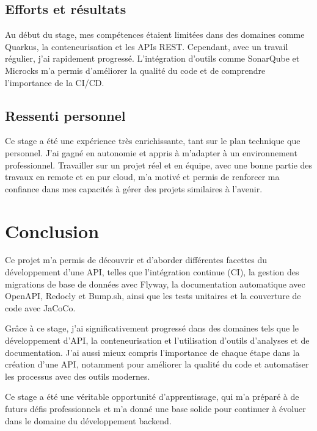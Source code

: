 \documentclass[11pt]{article}
\begin{document}
		\subsection*{Efforts et résultats}
		
		Au début du stage, mes compétences étaient limitées dans des domaines comme Quarkus, la conteneurisation et les APIs REST. Cependant, avec un travail régulier, j'ai rapidement progressé. L'intégration d'outils comme SonarQube et Microcks m'a permis d'améliorer la qualité du code et de comprendre l'importance de la CI/CD.
		
		\subsection*{Ressenti personnel}
		
			Ce stage a été une expérience très enrichissante, tant sur le plan technique que personnel. J'ai gagné en autonomie et appris à m'adapter à un environnement professionnel. Travailler sur un projet réel et en équipe, avec une bonne partie des travaux en remote et en pur cloud, m'a motivé et permis de renforcer ma confiance dans mes capacités à gérer des projets similaires à l'avenir.
		
	\section{Conclusion}
	
		Ce projet m'a permis de découvrir et d’aborder différentes facettes du développement d'une API, telles que l'intégration continue (CI), la gestion des migrations de base de données avec Flyway, la documentation automatique avec OpenAPI, Redocly et Bump.sh, ainsi que les tests unitaires et la couverture de code avec JaCoCo.
		
		\vspace{0.2cm}
		
		Grâce à ce stage, j’ai significativement progressé dans des domaines tels que le développement d'API, la conteneurisation et l’utilisation d’outils d'analyses et de documentation. J’ai aussi mieux compris l’importance de chaque étape dans la création d’une API, notamment pour améliorer la qualité du code et automatiser les processus avec des outils modernes.
		
		\vspace{0.2cm}
		
		Ce stage a été une véritable opportunité d’apprentissage, qui m’a préparé à de futurs défis professionnels et m’a donné une base solide pour continuer à évoluer dans le domaine du développement backend.
\end{document}
